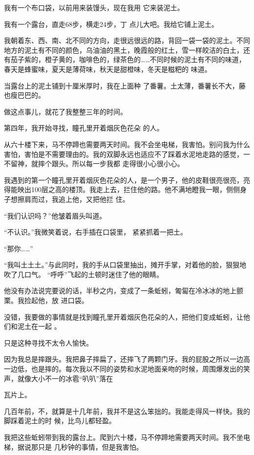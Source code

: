 \documentclass{article}
\begin{document}
我有一个布口袋，以前用来装馒头，现在我用
它来装泥土。 

我有一个露台，直走68步，横走24步，丁
点儿大吧。我给它铺上泥土。 

我朝着东、西、南、北不同的方向，走很远很远的路，背回一袋一袋的泥土。不同地方的泥土有不同的颜色，乌油油的黑土，晚霞般的红土，雪一样皎洁的白土，还有茄子紫的，橙子黄的，咖啡色的，绿茶色的……不同时候的泥土有不同的味道，春天是蜂蜜味，夏天是薄荷味，秋天是甜橙味，冬天是糍粑的
味道。 

当露台上的泥土铺到十厘米厚时，我在上面种
了番薯。土太薄，番薯长不大，藤也瘦巴巴的。 


\newpage

做这点事儿，就花了我整整三年的时间。 

第四年，我开始寻找，瞳孔里开着烟灰色花朵
的人。 

从六十楼下来，马不停蹄也需要两天时间。我不会坐电梯，我害怕。别问我为什么害怕，害怕是不需要理由的。我的双脚永远也适应不了踩着水泥地走路的感觉，一不留神，就摔个跟头。所以每一步我都
走得很小心很小心。 

我遇到的第一个瞳孔里开着烟灰色花朵的人，是一个男子，他的皮鞋很亮很亮，亮得能映出100层之高的楼顶。我走上去，拦住他的路。他不满地瞪我一眼，侧侧身子想擦肩而过，我追上他，又把他拦
住。 


“我们认识吗？”他皱着眉头叫道。 

“不认识。”我微笑着说，右手插在口袋里，
紧紧抓着一把土。 

\newpage


“那你……” 

“我叫土土土。”与此同时，我的手从口袋里抽出，摊开手掌，对着他的脸，狠狠地吹了几口气。
“呼呼”飞起的土顿时迷住了他的眼睛。 

他没有办法说完要说的话，半秒之内，变成了一条蚯蚓，匍匐在冷冰冰的地上颤栗。我捡起他，放
进口袋。 

没错，我要做的事情就是找到瞳孔里开着烟灰色花朵的人，把他们变成蚯蚓，让他们和泥土在一起
。 


只是这种寻找不太令人愉快。 

因为我总是摔跟头。我把鼻子摔扁了，还摔飞了两颗门牙。我的屁股之所以一边高一边低，也是摔的。每次我以不同的姿势和水泥地面亲吻的时候，周围爆发出的笑声，就像大小不一的冰雹“叭叭”落在

\newpage
瓦片上。 

几百年前，不，就算是十几年前，我并不是这么笨拙的。我能走得风一样快。我的脚踩着泥土的时
候，比鸟儿都轻盈。 

我把这些蚯蚓带到我的露台上。爬到六十楼，马不停蹄地需要两天时间。我不坐电梯，据说那只是
几秒钟的事情，但是我害怕。 
\end{document}
